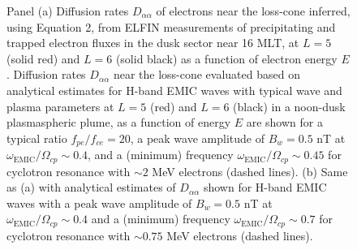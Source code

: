 \documentclass[
  letterpaper,
  DIV=11,
  numbers=noendperiod]{scrartcl}
\begin{document}
\begin{figure}


\caption{\label{fig-Daa_EMIC}Panel (a) Diffusion rates \(D_{\alpha\alpha}\) of electrons near the loss-cone inferred, using Equation 2, from ELFIN measurements of precipitating and trapped electron fluxes in the dusk sector near 16 MLT, at \(L=5\) (solid red) and \(L=6\) (solid black) as a function of electron energy \(E\). Diffusion rates \(D_{\alpha\alpha}\) near the loss-cone evaluated based on analytical estimates for H-band EMIC waves with typical wave and plasma parameters at \(L=5\) (red) and \(L=6\) (black) in a noon-dusk plasmaspheric plume, as a function of energy \(E\) are shown for a typical ratio \(f_{pe}/f_{ce}=20\), a peak wave amplitude of \(B_w=0.5\) nT at \(\omega_{\text{EMIC}}/\Omega_{cp}\sim 0.4\), and a (minimum) frequency \(\omega_{\text{EMIC}}/\Omega_{cp}\sim 0.45\) for cyclotron resonance with \(\sim2\) MeV electrons (dashed lines). (b) Same as (a) with analytical estimates of \(D_{\alpha\alpha}\) shown for H-band EMIC waves with a peak wave amplitude of \(B_w=0.5\) nT at \(\omega_{\text{EMIC}}/\Omega_{cp}\sim 0.4\) and a (minimum) frequency \(\omega_{\text{EMIC}}/\Omega_{cp}\sim 0.7\) for cyclotron resonance with \(\sim0.75\) MeV electrons (dashed lines).}

\end{figure}%

\newpage{}


  



\end{document}
